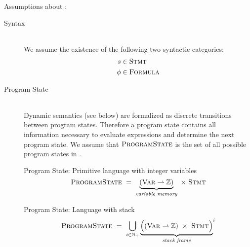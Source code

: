 Assumptions about \svl:
\begin{description}
\item[Syntax]~\\
    We assume the existence of the following two syntactic categories:
    \begin{align*}
    	s    & \in \textup{\textsc{Stmt}}    \\
    	\phi & \in \textup{\textsc{Formula}}
    \end{align*}
    
    
    \begin{comment}
    Let $\setStmt_s$ be the set of all statements having $s$ as prefix.
    \end{comment}
    
    
    
\item[Program State]~\\
    Dynamic semantics (see below) are formalized as discrete transitions between program states.
    Therefore a program state contains all information necessary to evaluate expressions and determine the next program state.
    We assume that $\textup{\textsc{ProgramState}}$ is the set of all possible program states in \svl.
    
    \begin{example}{Program State: Primitive language with integer variables}
        \begin{displaymath}
        \textup{\textsc{ProgramState}} ~=~ \underbrace{(\textup{\textsc{Var}} \rightharpoonup \mathbb{Z})}_{\textit{variable memory}} ~\times~ \textup{\textsc{Stmt}} 
        \end{displaymath}
    \end{example}
    \begin{example}{Program State: Language with stack}
        \begin{displaymath}
        \textup{\textsc{ProgramState}} ~=~ \bigcup_{i \in \mathbb{N}_+}{\underbrace{\Big((\textup{\textsc{Var}} \rightharpoonup \mathbb{Z}) ~\times~ \textup{\textsc{Stmt}} \Big)}_{\textit{stack frame}}}^i                                                      
        \end{displaymath}
    \end{example}
    

\end{description}
